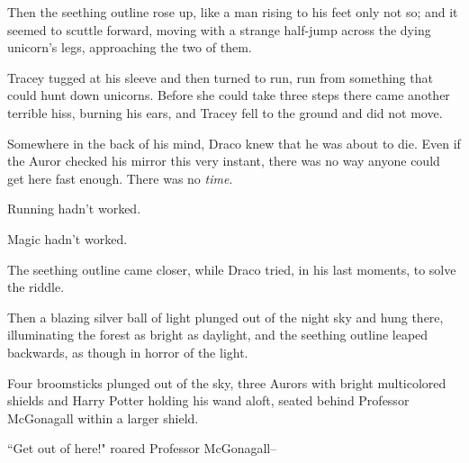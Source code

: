 Then the seething outline rose up, like a man rising to his feet only not so; and it seemed to scuttle forward, moving with a strange half-jump across the dying unicorn's legs, approaching the two of them.

Tracey tugged at his sleeve and then turned to run, run from something that could hunt down unicorns. Before she could take three steps there came another terrible hiss, burning his ears, and Tracey fell to the ground and did not move.

Somewhere in the back of his mind, Draco knew that he was about to die. Even if the Auror checked his mirror this very instant, there was no way anyone could get here fast enough. There was no \emph{time}.

Running hadn't worked.

Magic hadn't worked.

The seething outline came closer, while Draco tried, in his last moments, to solve the riddle.

Then a blazing silver ball of light plunged out of the night sky and hung there, illuminating the forest as bright as daylight, and the seething outline leaped backwards, as though in horror of the light.

Four broomsticks plunged out of the sky, three Aurors with bright multicolored shields and Harry Potter holding his wand aloft, seated behind Professor McGonagall within a larger shield.

``Get out of here!" roared Professor McGonagall\---

